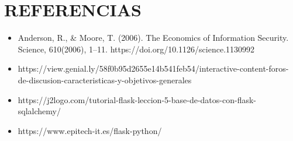 \documentclass[conference]{IEEEtran}
\begin{document}
\section{\textbf{REFERENCIAS}}


\begin{itemize}
\item Anderson, R., & Moore, T. (2006). The Economics of Information Security. Science, 610(2006), 1–11. https://doi.org/10.1126/science.1130992
\item https://view.genial.ly/58f0b95d2655e14b541feb54/interactive-content-foros-de-discusion-caracteristicas-y-objetivos-generales
\item https://j2logo.com/tutorial-flask-leccion-5-base-de-datos-con-flask-sqlalchemy/
\item https://www.epitech-it.es/flask-python/
\end{itemize}
\end{document}
